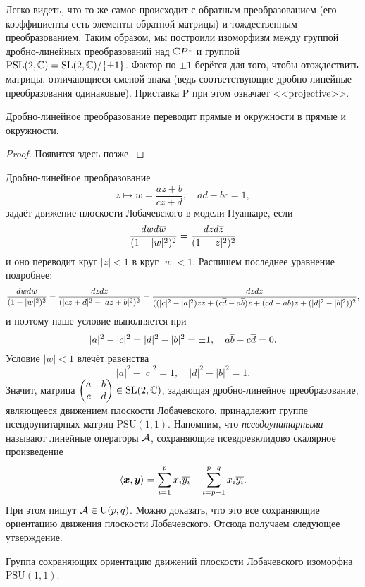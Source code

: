 Легко видеть, что то же самое происходит с обратным преобразованием (его коэффициенты есть элементы обратной матрицы) и тождественным преобразованием. Таким образом, мы построили изоморфизм между группой дробно-линейных преобразований над $\mathbb{C} P^1$ и группой $\mathrm{PSL}(2, \mathbb{C}) = \mathrm{SL}(2, \mathbb{C}) / \{\pm 1\}$. Фактор по $\pm 1$ берётся для того, чтобы отождествить матрицы, отличающиеся сменой знака (ведь соответствующие дробно-линейные преобразования одинаковые). Приставка $\mathrm{P}$ при этом означает <<projective>>.

\begin{proposition}
	Дробно-линейное преобразование переводит прямые и окружности в прямые и окружности.
\end{proposition}

\begin{proof}
	Появится здесь позже.
\end{proof}

\noindent
Дробно-линейное преобразование
\[
	z \mapsto w = \frac{az + b}{cz + d},\quad ad - bc = 1,
\]
задаёт движение плоскости Лобачевского в модели Пуанкаре, если
\[
	\frac{dwd\overline{w}}{(1 - |w|^2)^2} = \frac{dzd\overline{z}}{(1 - |z|^2)^2}
\]
и оно переводит круг $|z| < 1$ в круг $|w| < 1$. Распишем последнее уравнение подробнее:
\[
	\frac{dwd\overline{w}}{(1 - |w|^2)^2} = \frac{dzd\overline{z}}{(|cz + d|^2 - |az + b|^2)^2} = \frac{dzd\overline{z}}{((|c|^2 - |a|^2)z\overline{z} + (c\overline{d} - a\overline{b})z + (\overline{c}d - \overline{a}b)\overline{z} + (|d|^2 - |b|^2))^2},
\]
и поэтому наше условие выполняется при
\[
	|a|^2 - |c|^2 = |d|^2 - |b|^2 = \pm 1,\quad a\overline{b} - c\overline{d} = 0.
\]
Условие $|w| < 1$ влечёт равенства
\[
	|a|^2 - |c|^2 = 1,\quad |d|^2 - |b|^2 = 1.
\]
Значит, матрица
$\begin{pmatrix}
	a & b\\
	c & d
\end{pmatrix} \in \mathrm{SL}(2, \mathbb{C})$, задающая дробно-линейное преобразование, являющееся движением плоскости Лобачевского, принадлежит группе псевдоунитарных матриц $\mathrm{PSU}(1, 1)$. Напомним, что \textit{псевдоунитарными} называют линейные операторы $\mathcal{A}$, сохраняющие псевдоевклидово скалярное произведение
\[
	\langle\boldsymbol{x}, \boldsymbol{y}\rangle = \sum_{i = 1}^px_i\overline{y_i} - \sum_{i = p + 1}^{p + q}x_i\overline{y_i}.
\]
При этом пишут $\mathcal{A} \in \mathrm{U}(p, q)$. Можно доказать, что это все сохраняющие ориентацию движения плоскости Лобачевского. Отсюда получаем следующее утверждение.

\begin{proposition}
	Группа сохраняющих ориентацию движений плоскости Лобачевского изоморфна $\mathrm{PSU}(1, 1)$.
\end{proposition}

